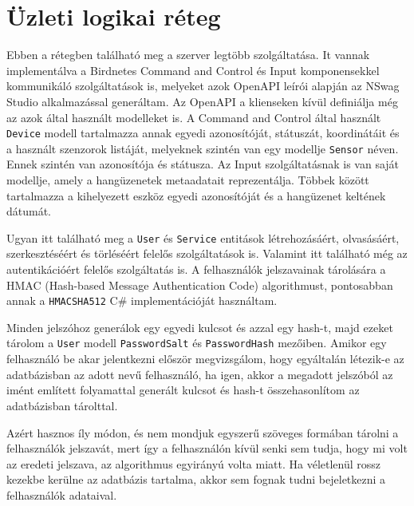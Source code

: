 \section{Üzleti logikai réteg}
Ebben a rétegben található meg a szerver legtöbb szolgáltatása. It vannak implementálva a Birdnetes Command and Control és Input komponensekkel kommunikáló szolgáltatások is, 
melyeket azok OpenAPI leírói alapján az NSwag Studio\cite{nswag-studio} alkalmazással generáltam. Az OpenAPI a klienseken kívül definiálja még az azok által használt modelleket is.
A Command and Control által használt \verb+Device+ modell tartalmazza annak egyedi azonosítóját, státuszát, koordinátáit és a használt szenzorok listáját, 
melyeknek szintén van egy modellje \verb+Sensor+ néven. Ennek szintén van azonosítója és státusza. Az Input szolgáltatásnak is van saját modellje, 
amely a hangüzenetek metaadatait reprezentálja. Többek között tartalmazza a kihelyezett eszköz egyedi azonosítóját és a hangüzenet keltének dátumát. 

Ugyan itt található meg a \verb+User+ és \verb+Service+ entitások létrehozásáért, olvasásáért, szerkesztéséért és törléséért felelős szolgáltatások is.
Valamint itt található még az autentikációért felelős szolgáltatás is. A felhasználók jelszavainak tárolására a HMAC (Hash-based Message Authentication Code) algorithmust, 
pontosabban annak a \verb+HMACSHA512+\cite{hmacsha512} C\# implementációját használtam. 

Minden jelszóhoz generálok egy egyedi kulcsot és azzal egy hash-t, majd ezeket tárolom a \verb+User+ modell \verb+PasswordSalt+ és \verb+PasswordHash+ mezőiben.
Amikor egy felhasználó be akar jelentkezni először megvizsgálom, hogy egyáltalán létezik-e az adatbázisban az adott nevű felhasználó, 
ha igen, akkor a megadott jelszóból az imént említett folyamattal generált kulcsot és hash-t összehasonlítom az adatbázisban tárolttal.

Azért hasznos íly módon, és nem mondjuk egyszerű szöveges formában tárolni a felhasználók jelszavát, mert így a felhasználón kívül senki sem tudja, hogy mi volt az eredeti jelszava,
az algorithmus egyirányú volta miatt\footnotemark. Ha véletlenül rossz kezekbe kerülne az adatbázis tartalma, akkor sem fognak tudni bejeletkezni a felhasználók adataival.

